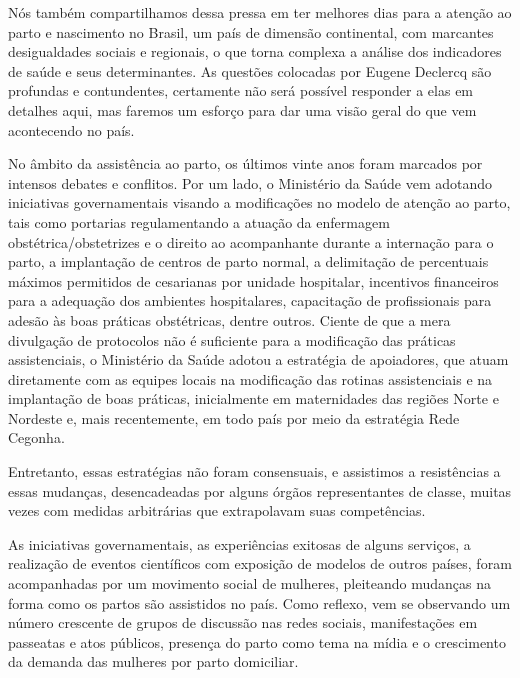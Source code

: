 \documentclass{article}
\begin{document}
Nós também compartilhamos dessa pressa em ter melhores dias para a atenção ao
parto e
nascimento no Brasil, um país de dimensão continental, com marcantes
desigualdades
sociais e regionais, o que torna complexa a análise dos indicadores de saúde e
seus
determinantes. As questões colocadas por Eugene Declercq são profundas e
contundentes,
certamente não será possível responder a elas em detalhes aqui, mas faremos um
esforço
para dar uma visão geral do que vem acontecendo no país.

No âmbito da assistência ao parto, os últimos vinte anos foram marcados por
intensos
debates e conflitos. Por um lado, o Ministério da Saúde vem adotando iniciativas
governamentais visando a modificações no modelo de atenção ao parto, tais como
portarias
regulamentando a atuação da enfermagem obstétrica/obstetrizes e o direito ao
acompanhante durante a internação para o parto, a implantação de centros de
parto
normal, a delimitação de percentuais máximos permitidos de cesarianas por
unidade
hospitalar, incentivos financeiros para a adequação dos ambientes hospitalares,
capacitação de profissionais para adesão às boas práticas obstétricas, dentre
outros.
Ciente de que a mera divulgação de protocolos não é suficiente para a
modificação das
práticas assistenciais, o Ministério da Saúde adotou a estratégia de apoiadores,
que
atuam diretamente com as equipes locais na modificação das rotinas assistenciais
e na
implantação de boas práticas, inicialmente em maternidades das regiões Norte e
Nordeste
e, mais recentemente, em todo país por meio da estratégia Rede Cegonha.

Entretanto, essas estratégias não foram consensuais, e assistimos a resistências
a essas
mudanças, desencadeadas por alguns órgãos representantes de classe, muitas vezes
com
medidas arbitrárias que extrapolavam suas competências.

As iniciativas governamentais, as experiências exitosas de alguns serviços, a
realização
de eventos científicos com exposição de modelos de outros países, foram
acompanhadas por
um movimento social de mulheres, pleiteando mudanças na forma como os partos são
assistidos no país. Como reflexo, vem se observando um número crescente de
grupos de
discussão nas redes sociais, manifestações em passeatas e atos públicos,
presença do
parto como tema na mídia e o crescimento da demanda das mulheres por parto
domiciliar.
\end{document}
